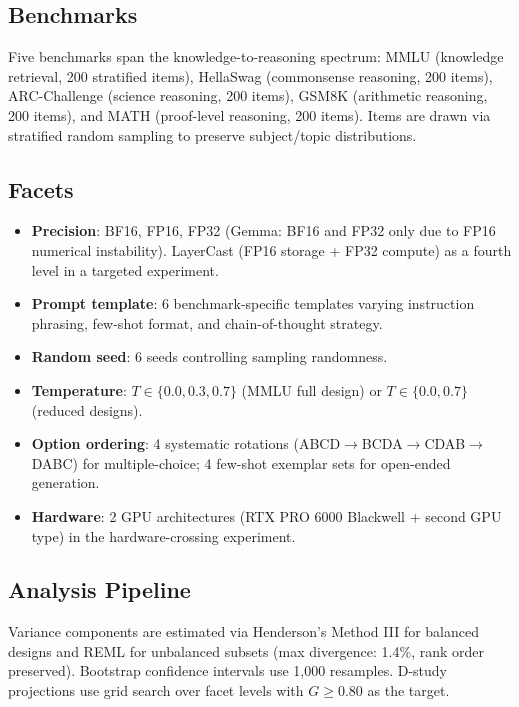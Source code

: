 \documentclass[letterpaper]{article}
\newcommand{\gcoeff}{\ensuremath{G}}
\newcommand{\pct}{\%}
\begin{document}
\subsection{Benchmarks}

Five benchmarks span the knowledge-to-reasoning spectrum:
MMLU (knowledge retrieval, 200 stratified items),
HellaSwag (commonsense reasoning, 200 items),
ARC-Challenge (science reasoning, 200 items),
GSM8K (arithmetic reasoning, 200 items),
and MATH (proof-level reasoning, 200 items).
Items are drawn via stratified random sampling to preserve subject/topic distributions.

\subsection{Facets}

\begin{itemize}
    \item \textbf{Precision}: BF16, FP16, FP32 (Gemma: BF16 and FP32 only due to FP16 numerical instability). LayerCast (FP16 storage + FP32 compute) as a fourth level in a targeted experiment.
    \item \textbf{Prompt template}: 6 benchmark-specific templates varying instruction phrasing, few-shot format, and chain-of-thought strategy.
    \item \textbf{Random seed}: 6 seeds controlling sampling randomness.
    \item \textbf{Temperature}: $T \in \{0.0, 0.3, 0.7\}$ (MMLU full design) or $T \in \{0.0, 0.7\}$ (reduced designs).
    \item \textbf{Option ordering}: 4 systematic rotations (ABCD$\to$BCDA$\to$CDAB$\to$DABC) for multiple-choice; 4 few-shot exemplar sets for open-ended generation.
    \item \textbf{Hardware}: 2 GPU architectures (RTX PRO 6000 Blackwell + second GPU type) in the hardware-crossing experiment.
\end{itemize}

\subsection{Analysis Pipeline}

Variance components are estimated via Henderson's Method III for balanced designs and REML for unbalanced subsets (max divergence: 1.4\pct{}, rank order preserved).
Bootstrap confidence intervals use 1,000 resamples.
D-study projections use grid search over facet levels with $\gcoeff{} \geq 0.80$ as the target.
\end{document}
